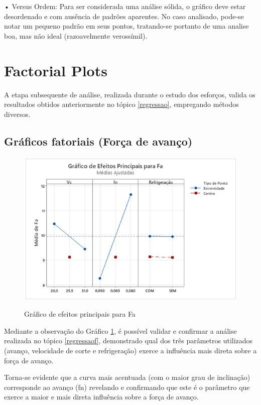 \documentclass[deposito, acronym, symbols]{fei}
\begin{document}
•	Versus Ordem: Para ser considerada uma análise sólida, o gráfico deve estar desordenado e com ausência de padrões aparentes. No caso analisado, pode-se notar um pequeno padrão em seus pontos, tratando-se portanto de uma analise boa, mas não ideal (razoavelmente verossímil).

\section{Factorial Plots}

A etapa subsequente de análise, realizada durante o estudo dos esforços, valida os resultados obtidos anteriormente no tópico \ref{regressao}, empregando métodos diversos.

\subsection{Gráficos fatoriais (Força de avanço)}

 \begin{figure}[!htp]
    \centering
    \caption{Gráfico de efeitos principais para Fa}
    \includegraphics[width=0.8\linewidth]{Imagens/efeitos1.png}
    \label{fig:efe1}
\end{figure}

Mediante a observação do Gráfico \ref{fig:efe1}, é possível validar e confirmar a análise realizada no tópico \ref{regressaof}, demonstrado qual dos três parâmetros utilizados (avanço, velocidade de corte e refrigeração) exerce a influência mais direta sobre a força de avanço. 

Torna-se evidente que a curva mais acentuada (com o maior grau de inclinação) corresponde ao avanço (fn) revelando e confirmando que este é o parâmetro que exerce a maior e mais direta influência sobre a força de avanço.
\end{document}
